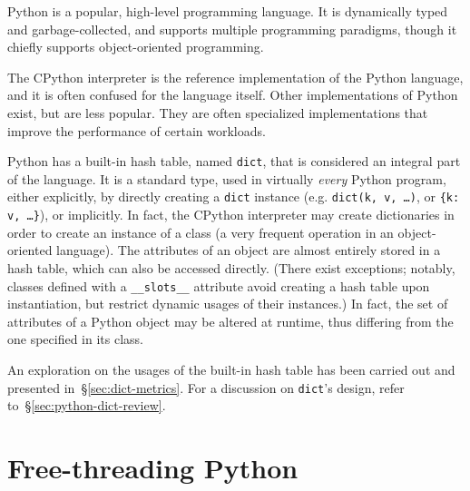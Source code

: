 Python is a popular, high-level programming language.
It is dynamically typed and garbage-collected, and supports multiple programming paradigms, though it chiefly supports object-oriented programming.

The CPython interpreter is the reference implementation of the Python language, and it is often confused for the language itself.
Other implementations of Python exist, but are less popular.
They are often specialized implementations that improve the performance of certain workloads.

Python has a built-in hash table, named \texttt{dict}, that is considered an integral part of the language.
It is a standard type, used in virtually \emph{every} Python program, either explicitly, by directly creating a \texttt{dict} instance (e.g. \texttt{{dict(k, v, \ldots)}}, or \texttt{\{k: v, \ldots\}}), or implicitly.
In fact, the CPython interpreter may create dictionaries in order to create an instance of a class (a very frequent operation in an object-oriented language).
The attributes of an object are almost entirely stored in a hash table, which can also be accessed directly.
(There exist exceptions; notably, classes defined with a \texttt{{\_\_slots\_\_}} attribute avoid creating a hash table upon instantiation, but restrict dynamic usages of their instances.)
In fact, the set of attributes of a Python object may be altered at runtime, thus differing from the one specified in its class.

An exploration on the usages of the built-in hash table has been carried out and presented in~\S\ref{sec:dict-metrics}.
For a discussion on \texttt{dict}'s design, refer to~\S\ref{sec:python-dict-review}.


\section{Free-threading Python}\label{sec:free-threading}

